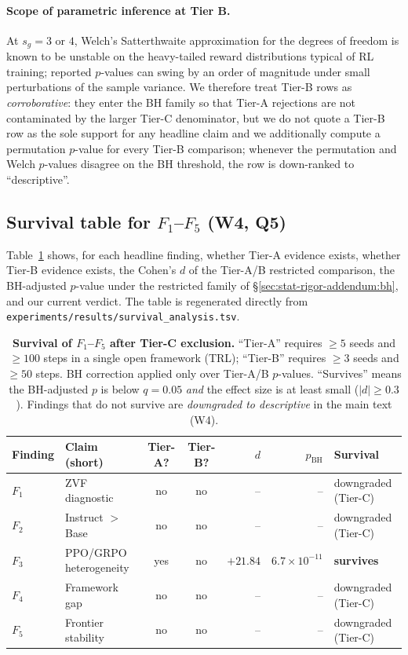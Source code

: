 \paragraph{Scope of parametric inference at Tier B.}
At $s_g = 3$ or $4$, Welch's Satterthwaite approximation for the
degrees of freedom is known to be unstable on the heavy-tailed reward
distributions typical of RL training; reported $p$-values can swing by
an order of magnitude under small perturbations of the sample variance.
We therefore treat Tier-B rows as \emph{corroborative}: they enter the
BH family so that Tier-A rejections are not contaminated by the larger
Tier-C denominator, but we do not quote a Tier-B row as the sole
support for any headline claim and we additionally compute a permutation
$p$-value for every Tier-B comparison; whenever the permutation and
Welch $p$-values disagree on the BH threshold, the row is
down-ranked to ``descriptive''.

\subsection{Survival table for $F_1$--$F_5$ (W4, Q5)}
\label{sec:stat-rigor-addendum:survival}

Table~\ref{tab:survival-f1-f5} shows, for each headline finding,
whether Tier-A evidence exists, whether Tier-B evidence exists,
the Cohen's $d$ of the Tier-A/B restricted comparison, the
BH-adjusted $p$-value under the restricted family of
\S\ref{sec:stat-rigor-addendum:bh}, and our current verdict. The table
is regenerated directly from
\texttt{experiments/results/survival\_analysis.tsv}.

\begin{table}[ht]
\centering
\caption{\textbf{Survival of $F_1$--$F_5$ after Tier-C exclusion.}
``Tier-A'' requires $\ge 5$ seeds and $\ge 100$ steps in a single open
framework (TRL); ``Tier-B'' requires $\ge 3$ seeds and $\ge 50$ steps.
BH correction applied only over Tier-A/B $p$-values. ``Survives''
means the BH-adjusted $p$ is below $q{=}0.05$ \emph{and} the effect
size is at least small ($|d| \ge 0.3$). Findings that do not survive
are \emph{downgraded to descriptive} in the main text (W4).}
\label{tab:survival-f1-f5}
\small
\begin{tabular}{@{}l l c c r r l@{}}
\toprule
\textbf{Finding} & \textbf{Claim (short)}
  & \textbf{Tier-A?} & \textbf{Tier-B?}
  & $d$ & $p_{\mathrm{BH}}$ & \textbf{Survival} \\
\midrule
$F_1$ & ZVF diagnostic              & no  & no  & --     & --       & downgraded (Tier-C) \\
$F_2$ & Instruct $>$ Base            & no  & no  & --     & --       & downgraded (Tier-C) \\
$F_3$ & PPO/GRPO heterogeneity       & yes & no  & $+21.84$ & $6.7\times 10^{-11}$ & \textbf{survives} \\
$F_4$ & Framework gap                & no  & no  & --     & --       & downgraded (Tier-C) \\
$F_5$ & Frontier stability           & no  & no  & --     & --       & downgraded (Tier-C) \\
\bottomrule
\end{tabular}
\end{table}

